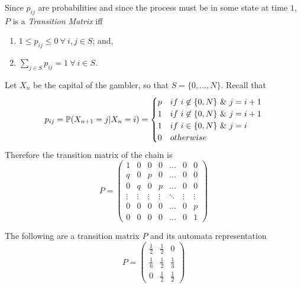 \documentclass[11pt,a4paper]{article}
\begin{document}
Since $p_{ij}$ are probabilities and since the process must be in some state at time $1$, $P$ is a \textit{Transition Matrix} iff
\begin{enumerate}[label=\roman*)]
	\item $1\leq p_{ij}\leq0\ \forall\ i,j\in S$; and,
	\item $\sum_{j\in S}p_{ij}=1\ \forall\ i\in S$.
\end{enumerate}

Let $X_n$ be the capital of the gambler, so that $S=\{0,\dots,N\}$. Recall that
$$p_{ij}=\prob(X_{n+1}=j|X_n=i)=\begin{cases}p&if\ i\not\in\{0,N\}\ \&\ j=i+1\\ 1&if\ i\not\in\{0,N\}\ \&\ j=i+1\\ 1&if\ i\in\{0,N\}\ \&\ j=i\\0&otherwise\end{cases}$$
Therefore the transition matrix of the chain is
$$P=\begin{pmatrix}1&0&0&0&\dots&0&0\\q&0&p&0&\dots&0&0\\0&q&0&p&\dots&0&0\\\vdots&\vdots&\vdots&\vdots&\ddots&\vdots&\vdots\\0&0&0&0&\dots&0&p\\0&0&0&0&\dots&0&1\end{pmatrix}$$

The following are a transition matrix $P$ and its automata representation\\
$$P=\begin{pmatrix}\frac{1}{2}&\frac{1}{2}&0\\\frac{1}{6}&\frac{1}{2}&\frac{1}{3}\\0&\frac{1}{2}&\frac{1}{2}\end{pmatrix}$$
\begin{center}
\end{center}
\end{document}
